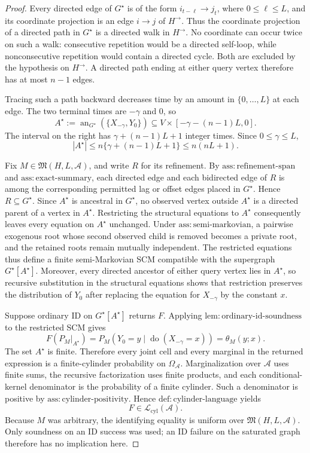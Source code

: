 \documentclass{article}
\begin{document}
\begin{proof}
Every directed edge of \(G^\star\) is of the form \(i_{t-\ell}\to j_t\), where \(0\leq\ell\leq L\), and its coordinate projection is an edge \(i\to j\) of \(H^{\to}\).  Thus the coordinate projection of a directed path in \(G^\star\) is a directed walk in \(H^{\to}\).  No coordinate can occur twice on such a walk: consecutive repetition would be a directed self-loop, while nonconsecutive repetition would contain a directed cycle.  Both are excluded by the hypothesis on \(H^{\to}\).  A directed path ending at either query vertex therefore has at most \(n-1\) edges.

Tracing such a path backward decreases time by an amount in \(\{0,\ldots,L\}\) at each edge.  The two terminal times are \(-\gamma\) and \(0\), so
\[
 A^\star:=\operatorname{an}_{G^\star}(\{X_{-\gamma},Y_0\})
 \subseteq V\times[-\gamma-(n-1)L,0].
\]
The interval on the right has \(\gamma+(n-1)L+1\) integer times.  Since \(0\leq\gamma\leq L\),
\[
 |A^\star|
 \leq n\{\gamma+(n-1)L+1\}
 \leq n(nL+1).
\]

Fix \(M\in\mathfrak M(H,L,\mathcal A)\), and write \(R\) for its refinement.  By \(\mathrm{ass:refinement\text{-}span}\) and \(\mathrm{ass:exact\text{-}summary}\), each directed edge and each bidirected edge of \(R\) is among the corresponding permitted lag or offset edges placed in \(G^\star\).  Hence \(R\subseteq G^\star\).  Since \(A^\star\) is ancestral in \(G^\star\), no observed vertex outside \(A^\star\) is a directed parent of a vertex in \(A^\star\).  Restricting the structural equations to \(A^\star\) consequently leaves every equation on \(A^\star\) unchanged.  Under \(\mathrm{ass:semi\text{-}markovian}\), a pairwise exogenous root whose second observed child is removed becomes a private root, and the retained roots remain mutually independent.  The restricted equations thus define a finite semi-Markovian SCM compatible with the supergraph \(G^\star[A^\star]\).  Moreover, every directed ancestor of either query vertex lies in \(A^\star\), so recursive substitution in the structural equations shows that restriction preserves the distribution of \(Y_0\) after replacing the equation for \(X_{-\gamma}\) by the constant \(x\).

Suppose ordinary ID on \(G^\star[A^\star]\) returns \(F\).  Applying \(\mathrm{lem:ordinary\text{-}id\text{-}soundness}\) to the restricted SCM gives
\[
 F(P_M|_{A^\star})
 =P_M(Y_0=y\mid\operatorname{do}(X_{-\gamma}=x))
 =\theta_M(y;x).
\]
The set \(A^\star\) is finite.  Therefore every joint cell and every marginal in the returned expression is a finite-cylinder probability on \(\Omega_{\mathcal A}\).  Marginalization over \(\mathcal A\) uses finite sums, the recursive factorization uses finite products, and each conditional-kernel denominator is the probability of a finite cylinder.  Such a denominator is positive by \(\mathrm{ass:cylinder\text{-}positivity}\).  Hence \(\mathrm{def:cylinder\text{-}language}\) yields
\[
 F\in\mathcal L_{\mathrm{cyl}}(\mathcal A).
\]
Because \(M\) was arbitrary, the identifying equality is uniform over \(\mathfrak M(H,L,\mathcal A)\).  Only soundness on an ID success was used; an ID failure on the saturated graph therefore has no implication here.
\end{proof}
\end{document}
